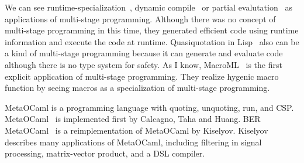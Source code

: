We can see runtime-specialization~\cite{ConselNoel1996Runtime},
dynamic compile~\cite{AuslanderPhiliposeChambersEggersBershad1996DynamicCompilation, EnglerHsiehKaashoek1996TickC, PolettoHsiehEnglerKaashoek1999CandTcc, GrantPhiliposeMockChambersEggers1999DyC} or
partial evalutation~\cite{JonesGomardSestoft1993partial} as applications of
multi-stage programming. Although there was no concept of multi-stage
programming in this time, they generated efficient code using runtime
information and execute the code at runtime. Quasiquotation in
Lisp~\cite{Bawden1999Lisp} also can be a kind of multi-stage programming
because it can generate and evaluate code although there is no type system for
safety. As I know, MacroML~\cite{GanzAmrTaha2001MacroML} is the first explicit
application of multi-stage programming. They realize hygenic macro function by
seeing macros as a specialization of multi-stage programming.


MetaOCaml is a programming language with quoting, unquoting, run, and CSP.
MetaOCaml~\cite{CalcagnoTahaHuangLeroy2003Implementing, Taha2007Gentle} is implemented
first by Calcagno, Taha and Huang. BER
MetaOCaml~\cite{Kiselyov2014BERMetaOCamlBER} is a reimplementation of MetaOCaml
by Kiselyov. Kiselyov~\cite{Kiselyov2018Reconcilong} describes many
applications of MetaOCaml, including filtering in signal processing,
matrix-vector product, and a DSL compiler.


